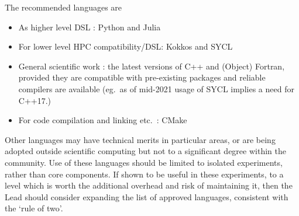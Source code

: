 The recommended languages are
\begin{itemize}
\item As higher level DSL : Python and Julia
\item For lower level HPC compatibility/DSL: Kokkos and SYCL
\item General scientific work : the latest versions of C++ and (Object) Fortran, provided
they are compatible with pre-existing packages and reliable compilers are available
(eg.\ as of mid-2021 usage of SYCL implies a need for C++17.)
\item For code compilation and linking etc.\ : CMake
\end{itemize}

Other languages may have technical merits in particular areas, or are
being adopted outside scientific computing but not to a significant
degree within the community.  Use of these languages should be limited
to isolated experiments, rather than core components. If shown to be
useful in these experiments, to a level which is worth the additional
overhead and risk of maintaining it, then the Lead should consider
expanding the list of approved languages, consistent with the `rule of two'.

